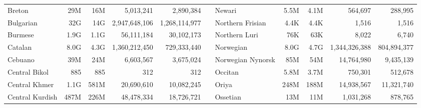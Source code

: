 \begin{table*}[t!]
{\begin{tabular}{@{}lrrrrclrrrr@{}}
            Breton                    & 29M                      & 16M                       & 5,013,241                & 2,890,384                 &                          & Newari                    & 5.5M                     & 4.1M                      & 564,697                  & 288,995                   \\
            Bulgarian                 & 32G                      & 14G                       & 2,947,648,106            & 1,268,114,977             &                          & Northern Frisian          & 4.4K                     & 4.4K                      & 1,516                    & 1,516                     \\
            Burmese                   & 1.9G                     & 1.1G                      & 56,111,184               & 30,102,173                &                          & Northern Luri             & 76K                      & 63K                       & 8,022                    & 6,740                     \\
            Catalan                   & 8.0G                     & 4.3G                      & 1,360,212,450            & 729,333,440               &                          & Norwegian                 & 8.0G                     & 4.7G                      & 1,344,326,388            & 804,894,377               \\
            Cebuano                   & 39M                      & 24M                       & 6,603,567                & 3,675,024                 &                          & Norwegian Nynorsk         & 85M                      & 54M                       & 14,764,980               & 9,435,139                 \\
            Central Bikol             & 885                      & 885                       & 312                      & 312                       &                          & Occitan                   & 5.8M                     & 3.7M                      & 750,301                  & 512,678                   \\
            Central Khmer             & 1.1G                     & 581M                      & 20,690,610               & 10,082,245                &                          & Oriya                     & 248M                     & 188M                      & 14,938,567               & 11,321,740                \\
            Central Kurdish           & 487M                     & 226M                      & 48,478,334               & 18,726,721                &                          & Ossetian                  & 13M                      & 11M                       & 1,031,268                & 878,765                   \\

\end{tabular}}
\end{table*}
